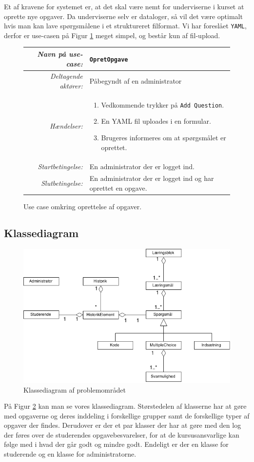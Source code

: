 \documentclass[11pt, a4paper]{article}
\begin{document}
Et af kravene for systemet er, at det skal være nemt for underviserne i kurset at oprette nye opgaver. Da underviserne selv er dataloger, så vil det være optimalt hvis man kan lave spørgsmålene i et struktureret filformat. Vi har foreslået \verb!YAML!, derfor er use-casen på Figur \ref{fig:use_case3} meget simpel, og består kun af fil-upload.
\begin{figure}[h!]
    \centering
    \begin{tabular}{r p{8cm}}
        \toprule
        \textit{Navn på use-case:} & \verb!OpretOpgave! \\
        \hline
        \textit{Deltagende aktører:} & Påbegyndt af en administrator \\
        \hline
        \textit{Hændelser:} & \begin{enumerate}[nolistsep]
            \item Vedkommende trykker på \verb!Add Question!.
            \item En YAML fil uploades i en formular.
            \item Brugeres informeres om at spørgsmålet er oprettet.
        \end{enumerate}  \\
        \hline
        \textit{Startbetingelse:} & En administrator der er logget ind. \\
        \hline
        \textit{Slutbetingelse:} & En administrator der er logget ind og har oprettet en opgave. \\
        \bottomrule
    \end{tabular}
    \caption{Use case omkring oprettelse af opgaver.}
    \label{fig:use_case3}
\end{figure}

\subsection{Klassediagram}
\begin{figure}[h]
    \centering
    \includegraphics[width=0.8\linewidth]{figures/ClassDiagram.png}
    \caption{Klassediagram af problemområdet}
    \label{fig:class_diagram}
\end{figure}
På Figur \ref{fig:class_diagram} kan man se vores klassediagram. Størstedelen af klasserne har at gøre med opgaverne og deres inddeling i forskellige grupper samt de forskellige typer af opgaver der findes. Derudover er der et par klasser der har at gøre med den log der føres over de studerendes opgavebesvarelser, for at de kursusansvarlige kan følge med i hvad der går godt og mindre godt. Endeligt er der en klasse for studerende og en klasse for administratorne.
\end{document}
